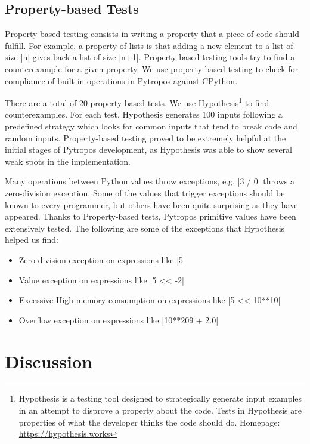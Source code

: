 \subsection{Property-based Tests}\label{property-based-tests}

Property-based testing consists in writing a property that a piece of code should fulfill.
For example, a property of lists is that adding a new element to a list of size \pycode|n|
gives back a list of size \pycode|n+1|. Property-based testing tools try to find a
counterexample for a given property. We use property-based testing to check for compliance
of built-in operations in Pytropos against CPython.

There are a total of 20 property-based tests. We use Hypothesis\footnote{Hypothesis is a
  testing tool designed to strategically generate input examples in an attempt to disprove
  a property about the code. Tests in Hypothesis are properties of what the developer
  thinks the code should do. Homepage: \url{https://hypothesis.works}}
to find counterexamples. For each test, Hypothesis
generates 100 inputs following a predefined strategy which looks for common inputs that
tend to break code and random inputs. Property-based testing proved to be extremely
helpful at the initial stages of Pytropos development, as Hypothesis was able to show
several weak spots in the implementation.

Many operations between Python values throw exceptions, e.g. \pycode|3 / 0| throws a
zero-division exception. Some of the values that trigger exceptions should be known to
every programmer, but others have been quite surprising as they have appeared. Thanks to
Property-based tests, Pytropos primitive values have been extensively tested. The following
are some of the exceptions that Hypothesis helped us find:

\begin{itemize}
\tightlist
\item Zero-division exception on expressions like \pycode|5 %
\item Value exception on expressions like \pycode|5 << -2|
\item Excessive High-memory consumption on expressions like \pycode|5 << 10**10|
\item Overflow exception on expressions like \pycode|10**209 + 2.0|
\end{itemize}

\section{Discussion}\label{discussion}


